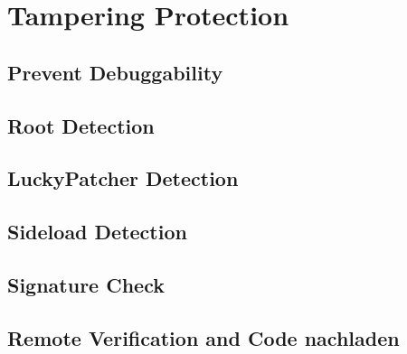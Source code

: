 \section{Tampering Protection} \label{section:tampering}

\subsection{Prevent Debuggability} \label{subsection:tampering-debuggable}
\subsection{Root Detection} \label{subsection:tampering-root}
\subsection{LuckyPatcher Detection} \label{subsection:tampering-luckypatcher}
\subsection{Sideload Detection} \label{subsection:tampering-sideload}
\subsection{Signature Check} \label{subsection:tampering-signature}
\subsection{Remote Verification and Code nachladen} \label{subsection:external-remote}
